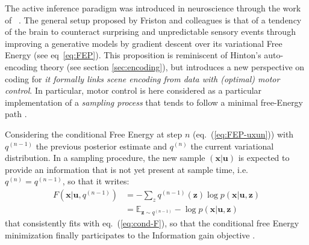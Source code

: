 \documentclass[12pt,twoside,openright]{article}
\begin{document}
The active inference paradigm was introduced in neuroscience through the work of ~\cite{friston2010free,friston2012perceptions}. %
The general setup proposed by Friston and colleagues is that of a tendency of the brain to counteract surprising and unpredictable sensory events through 
improving a generative models by gradient descent over its variational Free Energy (see eq~\ref{eq:FEP}). 
This proposition is reminiscent of Hinton's auto-encoding theory (see section \ref{sec:encoding}), but introduces a new perspective on coding
for \emph{it formally links scene encoding from data with (optimal) motor control}.
In particular, motor control is here considered as a particular implementation of a \emph{sampling process}
that tends to follow a minimal free-Energy path \cite{friston2015active}.

Considering the conditional Free Energy at step $n$ (eq.~(\ref{eq:FEP-uxun}))
with $q^{(n-1)}$ the previous posterior estimate and $q^{(n)}$ the current variational distribution. In a sampling procedure, the new sample 
$(\boldsymbol{x}|\boldsymbol{u})$ is expected to provide an information that is not yet present at sample time, i.e. 
$q^{(n)} = q^{(n-1)}$, so that it writes:
\begin{align}
F(\boldsymbol{x}|\boldsymbol{u}, q^{(n-1)}) &= -\sum_z q^{(n-1)}(\boldsymbol{z}) \log p(\boldsymbol{x}|\boldsymbol{u}, \boldsymbol{z})\nonumber\\
&= \mathbb{E}_{\boldsymbol{z} \sim q^{(n-1)}} -\log p(\boldsymbol{x}|\boldsymbol{u}, \boldsymbol{z})
\end{align}
that consistently fits with eq.~(\ref{eq:cond-F}), so that the conditional free Energy minimization finally participates to the Information gain objective \cite{tishby2011information}.
\end{document}
